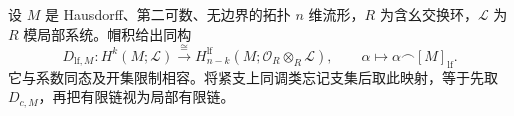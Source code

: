 \begin{theorem}\label{g2:thm:poincare-duality-locally-finite}
	设 \(M\) 是 Hausdorff、第二可数、无边界的拓扑 \(n\) 维流形，\(R\) 为含幺交换环，\(\mathcal L\) 为 \(R\) 模局部系统。帽积给出同构
	\begin{equation}\label{g2:eq:poincare-locally-finite}
		D_{\mathrm{lf},M}:H^k(M;\mathcal L)\xrightarrow{\ \cong\ }
		H_{n-k}^{\mathrm{lf}}(M;\mathcal O_R\otimes_R\mathcal L),
		\qquad\alpha\longmapsto\alpha\frown[M]_{\mathrm{lf}}.
	\end{equation}
	它与系数同态及开集限制相容。将紧支上同调类忘记支集后取此映射，等于先取 \(D_{c,M}\)，再把有限链视为局部有限链。
\end{theorem}
